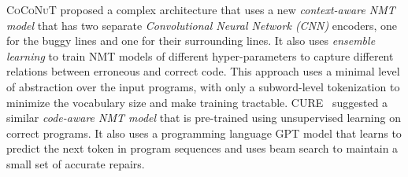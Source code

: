 %
\textsc{CoCoNuT} \citep{Lutellier2020} proposed a complex architecture that uses
a new \emph{context-aware NMT model} that has two separate \emph{Convolutional
Neural Network (CNN)} encoders, one for the buggy lines and one for their
surrounding lines. It also uses \emph{ensemble learning} to train NMT models of
different hyper-parameters to capture different relations between
erroneous and correct code. This approach uses a minimal level of abstraction
over the input programs, with only a subword-level tokenization to minimize the
vocabulary size and make training tractable.
%
\textsc{CURE}~\citep{Jiang_2021} suggested a similar \emph{code-aware NMT model}
that is pre-trained using unsupervised learning on correct programs. It also
uses a programming language \textsc{GPT} \citep{GPT2020} model that learns
to predict the next token in program sequences and uses beam search to maintain
a small set of accurate repairs.
